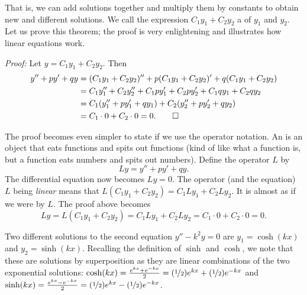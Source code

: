That is, we can add solutions together and multiply them by constants to
obtain new and different solutions.  We call
the expression $C_1 y_1 + C_2 y_2$ a
\emph{} of $y_1$ and $y_2$.
Let us
prove this theorem; the
proof is very enlightening and illustrates how linear equations work.

\medskip

\emph{Proof:}
Let 
$y = C_1 y_1 + C_2 y_2$.  Then
\begin{equation*}
\begin{split}
y'' + py' + qy & =
(C_1 y_1 + C_2 y_2)'' + p(C_1 y_1 + C_2 y_2)' + q(C_1 y_1 + C_2 y_2) \\
& = C_1 y_1'' + C_2 y_2'' + C_1 p y_1' + C_2 p y_2' + C_1 q y_1 + C_2 q y_2 \\
& = C_1 ( y_1'' + p y_1' + q y_1 ) + C_2 ( y_2'' + p y_2' + q y_2 ) \\
& = C_1 \cdot 0 + C_2 \cdot 0 = 0 . \qed
\end{split}
\end{equation*}

\medskip

The proof becomes even simpler to state if we use the
operator notation.
An \emph{} is an object that eats functions and spits out functions (kind of
like what a function is, but a function eats numbers and spits out numbers).
Define the operator $L$ by
\begin{equation*}
Ly = y'' + py' + qy .
\end{equation*}
The differential equation now becomes $Ly=0$.
The operator (and the equation)
$L$ being \emph{linear} means that $L(C_1y_1 + C_2y_2) = 
C_1 Ly_1 + C_2 Ly_2$.  It is almost as if we were  by $L$.  The proof above becomes
\begin{equation*}
Ly = L(C_1y_1 + C_2y_2) = 
C_1 Ly_1 + C_2 Ly_2 = C_1 \cdot 0 + C_2 \cdot 0 = 0 .
\end{equation*}

\medskip

Two different solutions to the second equation $y'' - k^2y = 0$ are
$y_1 = \cosh (kx)$ and $y_2 = \sinh (kx)$.
Recalling the definition of $\sinh$ and $\cosh$,
we note that these are solutions by
superposition as they
are linear combinations of the two
exponential solutions:
$\cosh(kx) = \frac{e^{kx}  + e^{-kx}}{2} = (\nicefrac{1}{2}) e^{kx}  +
(\nicefrac{1}{2}) e^{-kx}$ and
$\sinh(kx) = \frac{e^{kx} - e^{-kx}}{2} = (\nicefrac{1}{2}) e^{kx}  -
(\nicefrac{1}{2}) e^{-kx}$.

